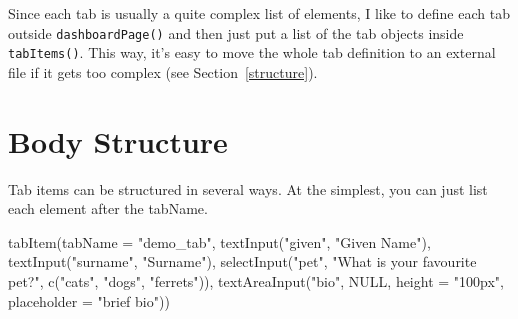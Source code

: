 \documentclass[
  oneside]{book}
\newenvironment{Shaded}{\begin{snugshade}}{\end{snugshade}}
\newcommand{\AttributeTok}[1]{\textcolor[rgb]{0.77,0.63,0.00}{#1}}
\newcommand{\CommentTok}[1]{\textcolor[rgb]{0.56,0.35,0.01}{\textit{#1}}}
\newcommand{\ConstantTok}[1]{\textcolor[rgb]{0.00,0.00,0.00}{#1}}
\newcommand{\FunctionTok}[1]{\textcolor[rgb]{0.00,0.00,0.00}{#1}}
\newcommand{\NormalTok}[1]{#1}
\newcommand{\SpecialCharTok}[1]{\textcolor[rgb]{0.00,0.00,0.00}{#1}}
\newcommand{\StringTok}[1]{\textcolor[rgb]{0.31,0.60,0.02}{#1}}
\begin{document}
\begin{Shaded}
\end{Shaded}

Since each tab is usually a quite complex list of elements, I like to define each tab outside \texttt{dashboardPage}\texttt{()} and then just put a list of the tab objects inside \texttt{tabItems}\texttt{()}. This way, it's easy to move the whole tab definition to an external file if it gets too complex (see Section~\ref{structure}).

\hypertarget{body-structure}{%
\section{Body Structure}\label{body-structure}}

Tab items can be structured in several ways. At the simplest, you can just list each element after the \AttributeTok{tabName}.

\begin{Shaded}
\begin{Highlighting}[]
\FunctionTok{tabItem}\NormalTok{(}\AttributeTok{tabName =} \StringTok{"demo\_tab"}\NormalTok{, }\FunctionTok{textInput}\NormalTok{(}\StringTok{"given"}\NormalTok{, }\StringTok{"Given Name"}\NormalTok{), }\FunctionTok{textInput}\NormalTok{(}\StringTok{"surname"}\NormalTok{,}
    \StringTok{"Surname"}\NormalTok{), }\FunctionTok{selectInput}\NormalTok{(}\StringTok{"pet"}\NormalTok{, }\StringTok{"What is your favourite pet?"}\NormalTok{, }\FunctionTok{c}\NormalTok{(}\StringTok{"cats"}\NormalTok{, }\StringTok{"dogs"}\NormalTok{,}
    \StringTok{"ferrets"}\NormalTok{)), }\FunctionTok{textAreaInput}\NormalTok{(}\StringTok{"bio"}\NormalTok{, }\ConstantTok{NULL}\NormalTok{, }\AttributeTok{height =} \StringTok{"100px"}\NormalTok{, }\AttributeTok{placeholder =} \StringTok{"brief bio"}\NormalTok{))}
\end{Highlighting}
\end{Shaded}
\end{document}
